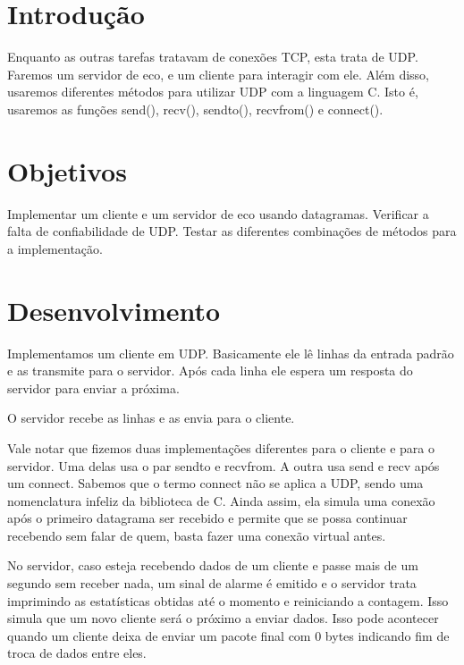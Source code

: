 \documentclass[12pt,a4paper]{article}
\begin{document}


\tableofcontents

\section{Introdução}

Enquanto as outras tarefas tratavam de conexões TCP, esta trata de UDP.
Faremos um servidor de eco, e um cliente para interagir com ele. 
Além disso, usaremos diferentes métodos para utilizar UDP com a linguagem C.
Isto é, usaremos as funções send(), recv(), sendto(), recvfrom() e connect().

\section{Objetivos}

Implementar um cliente e um servidor de eco usando datagramas. Verificar a falta de confiabilidade de UDP.
Testar as diferentes combinações de métodos para a implementação.

\section{Desenvolvimento}

Implementamos um cliente em UDP. Basicamente ele lê linhas da entrada padrão e as transmite para o servidor. Após cada linha ele espera um resposta do servidor para enviar a próxima. 

O servidor recebe as linhas e as envia para o cliente. 

Vale notar que fizemos duas implementações diferentes para o cliente e para o servidor. Uma delas usa o par sendto e recvfrom. A outra usa send e recv após um connect. Sabemos que o termo connect não se aplica a UDP, sendo uma nomenclatura infeliz da biblioteca de C. Ainda assim, ela simula uma conexão após o primeiro datagrama ser recebido e permite que se possa continuar recebendo sem falar de quem, basta fazer uma conexão virtual antes.

No servidor, caso esteja recebendo dados de um cliente e passe mais de um segundo sem receber nada, um sinal de alarme é emitido e o servidor trata imprimindo as estatísticas obtidas até o momento e reiniciando a contagem. Isso simula que um novo cliente será o próximo a enviar dados. Isso pode acontecer quando um cliente deixa de enviar um pacote final com 0 bytes indicando fim de troca de dados entre eles. 
\end{document}
